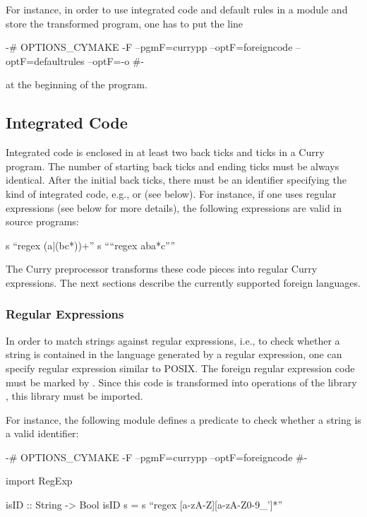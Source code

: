 For instance, in order to use integrated code and default rules
in a module and store the transformed program,
one has to put the line
\begin{curry}
{-# OPTIONS_CYMAKE -F --pgmF=currypp --optF=foreigncode --optF=defaultrules --optF=-o #-}
\end{curry}
at the beginning of the program.


\subsection{Integrated Code}

Integrated code is enclosed in at least two back ticks and ticks
in a Curry program. The number of starting back ticks and ending ticks
must be always identical.
After the initial back ticks, there must be an identifier
specifying the kind of integrated code,
e.g.,  or  (see below).
For instance, if one uses regular expressions (see below for more details),
the following expressions are valid in source programs:
\begin{curry}
  s ``regex (a|(bc*))+''
  s ````regex aba*c''''
\end{curry}
The Curry preprocessor transforms these code pieces into regular
Curry expressions. The next sections describe the currently
supported foreign languages.


\subsubsection{Regular Expressions}

In order to match strings against regular expressions, i.e.,
to check whether a string is contained in the language
generated by a regular expression, one can specify
regular expression similar to POSIX. The foreign regular
expression code must be marked by .
Since this code is transformed into operations of the \CYS library
, this library must be imported.

For instance, the following module defines a predicate
to check whether a string is a valid identifier:

\begin{curry}
{-# OPTIONS_CYMAKE -F --pgmF=currypp --optF=foreigncode #-}

import RegExp

isID :: String -> Bool
isID s = s ``regex [a-zA-Z][a-zA-Z0-9_']*''
\end{curry}


